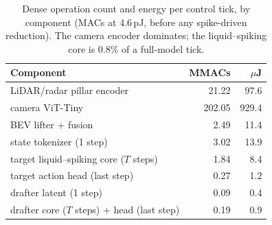 \begin{table}[t]\centering\small
\caption{Dense operation count and energy per control tick, by component (MACs at 4.6\,pJ, before any spike-driven
reduction). The camera encoder dominates; the liquid--spiking core is 0.8\% of a full-model tick.}\label{tab:energy}
\begin{tabular}{lrr}\toprule Component & MMACs & $\mu$J \\\midrule
LiDAR/radar pillar encoder & 21.22 & 97.6 \\
camera ViT-Tiny & 202.05 & 929.4 \\
BEV lifter + fusion & 2.49 & 11.4 \\
state tokenizer (1 step) & 3.02 & 13.9 \\
target liquid--spiking core ($T$ steps) & 1.84 & 8.4 \\
target action head (last step) & 0.27 & 1.2 \\
drafter latent (1 step) & 0.09 & 0.4 \\
drafter core ($T$ steps) + head (last step) & 0.19 & 0.9 \\
\bottomrule\end{tabular}\end{table}
